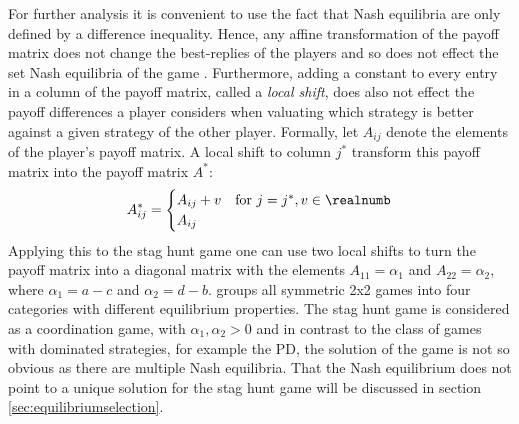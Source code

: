 For further analysis it is convenient to use the fact that Nash equilibria 
are only defined by a difference inequality. 
Hence, any affine transformation of the payoff matrix does not change the 
best-replies of the players and so does not effect the set Nash equilibria 
of the game \parencite[17-19]{weibull_evolutionary_1997}. 
Furthermore, adding a constant to every entry in a column of the payoff matrix, 
called a \textit{local shift}, does also not effect the payoff differences
a player considers when valuating which strategy is better against a given
strategy of the other player.
Formally, let $A_{ij}$ denote the elements of the player's payoff matrix. 
A local shift to column $j^*$ transform this payoff matrix into the payoff 
matrix $A^*$:
\begin{align*}
        A^*_{ij} =
        \begin{cases}
                A_{ij} + v & \text{for}\ j=j^*, v \in \realnumb \\
                A_{ij}
        \end{cases}
\end{align*}
Applying this to the stag hunt game one can use two local shifts to turn 
the payoff matrix into a diagonal matrix with the elements $A_{11}=\alpha_1$ 
and $A_{22}=\alpha_2$, where $\alpha_1=a-c$ and $\alpha_2=d-b$. 
\textcite[28]{weibull_evolutionary_1997} groups all symmetric 2x2 games into 
four categories with different equilibrium properties. 
The stag hunt game is considered as a coordination 
game, with $\alpha_1, \alpha_2 > 0$ and in contrast to the class of games
with dominated strategies, for example the PD, the solution of the game
is not so obvious as there are multiple Nash equilibria.
That the Nash equilibrium does not point to a unique solution for the stag
hunt game will be discussed in section \ref{sec:equilibriumselection}.

